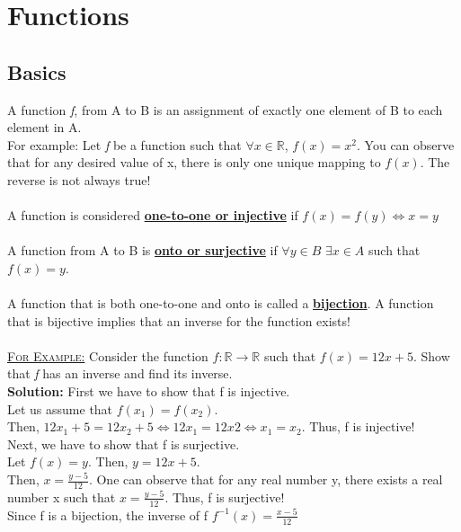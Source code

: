 \chapter{Functions}
\section{Basics}
A function \emph{f}, from A to B is an assignment of exactly one element of B
to each element in A. \\
For example: Let \emph{f} be a function such that $\forall x \in \mathbb{R}$,
$f(x) = x^{2}$. You can observe that for any desired value of x, there is only
one unique mapping to $f(x)$. The reverse is not always true! \\ \\
A function is considered \textbf{\underline{one-to-one or injective}} if $f(x)
= f(y) \Leftrightarrow x = y$ \\ \\
A function from A to B is \textbf{\underline{onto or surjective}} if $\forall y
\in B$ $\exists x \in A$ such that $f(x) = y$. \\ \\
A function that is both one-to-one and onto is called a
\textbf{\underline{bijection}}. A function that is bijective implies that an
inverse for the function exists! \\ \\
\textsc{\underline{For Example:}} Consider the function $f:\mathbb{R}
\rightarrow \mathbb{R}$ such that $f(x) = 12x + 5$. Show that \emph{f} has an
inverse and find its inverse. \\
\indent \textbf{Solution:} First we have to show that f is injective. \\
\indent \indent Let us assume that $f(x_{1}) = f(x_{2})$.\\ \indent \indent
Then, $12x_{1} + 5 = 12x_{2} + 5 \Leftrightarrow 12x_{1} = 12{x2}
\Leftrightarrow x_{1} = x_{2}$. Thus, f is injective! \\
\indent Next, we have to show that f is surjective. \\
\indent \indent Let $f(x) = y$. Then, $y = 12x + 5$. \\
\indent \indent Then, $x = \frac{y - 5}{12}$. One can observe that for any real
number y, there exists a real number x such that $x = \frac{y - 5}{12}$. Thus,
f is surjective! \\
\indent Since f is a bijection, the inverse of f $f^{-1}(x) = \frac{x - 5}{12}$

